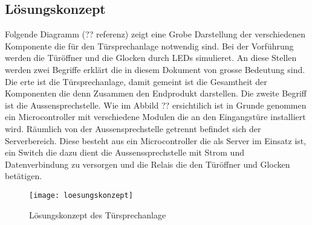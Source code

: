 \subsection{Lösungskonzept}
\label{sec:lösungskonzept}
Folgende Diagramm (?? referenz) zeigt eine Grobe Darstellung der verschiedenen Komponente die für den Türsprechanlage notwendig sind. Bei der Vorführung werden die Türöffner und die Glocken durch LEDs simulieret. 
An diese Stellen werden zwei Begriffe erklärt die in diesem Dokument von grosse Bedeutung sind. Die erte ist die Türsprechanlage, damit gemeint ist die Gesamtheit der Komponenten die denn Zusammen den Endprodukt darstellen.
Die zweite Begriff ist die Aussensprechstelle. Wie im Abbild ?? ersichtilich ist in Grunde genommen ein Microcontroller mit verschiedene Modulen die an den Eingangstüre installiert wird. Räumlich von der Aussensprechstelle getrennt befindet sich der Serverbereich. Diese besteht aus ein Microcontroller die als Server im Einsatz ist, ein Switch die dazu dient die Aussenssprechstelle mit Strom und Datenverbindung zu versorgen und die Relais die den Türöffner und Glocken betätigen.

\begin{figure}[htb!]
	\begin{center}
		\texttt{[image: loesungskonzept]}
		\caption[Lösungskonzept]{Lösungskonzept des Türsprechanlage}
		\label{fig:Lösungskonzept}
	\end{center}
\end{figure}
 
\newpage
